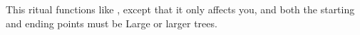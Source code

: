 \begin{spelleffect}
This ritual functions like , except that it only affects you, and both the starting and ending points must be Large or larger trees.
\end{spelleffect}
\begin{comment}
You gain the ability to enter trees and move from inside one tree to inside another tree. The first tree you enter and all others you enter must be of the same kind, must be living, and must have girth at least equal to yours. By moving into an oak tree (for example), you instantly know the location of all other oak trees within transport range (see below) and may choose whether you want to pass into one or simply step back out of the tree you moved into. You may choose to pass to any tree of the appropriate kind within the transport range as shown on the following table.
\begin{dtable}
\begin{tabularx}{\columnwidth}{>{\lcol}X >{\lcol}X}
Type of Tree & Transport Range \\
Oak, ash, yew & 3,000 feet \\
Elm, linden & 2,000 feet \\
Other deciduous & 1,500 feet \\
Any coniferous & 1,000 feet \\
All other trees & 500 feet
\end{tabularx}
\end{dtable}
\par You may move into a tree up to one time per caster level (passing from one tree to another counts only as moving into one tree). The spell lasts until the duration expires or you exit a tree. Each transport is a full-round action.
\par You can, at your option, remain within a tree without transporting yourself, but you are forced out when the spell ends. If the tree in which you are concealed is chopped down or burned, you are slain if you do not exit before the process is complete.
\end{comment}


